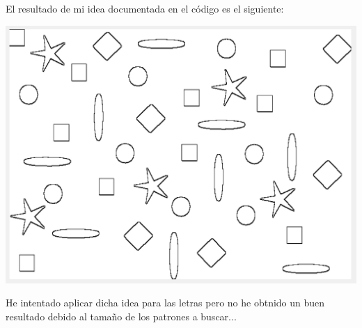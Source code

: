 \documentclass[12pt]{article}
\begin{document}
El resultado de mi idea documentada en el código es el siguiente:

\includegraphics[width=\linewidth]{images/figuras_custom.png}

He intentado aplicar dicha idea para las letras pero no he obtnido un buen resultado debido al tamaño de los patrones a buscar...
\end{document}
